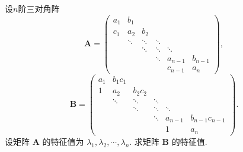 \documentclass[../../main.tex]{subfiles}
\begin{document}
\begin{example}
设$n$阶三对角阵
\[
\boldsymbol{A} = \begin{pmatrix} a_1 & b_1 \\ c_1 & a_2 & b_2 \\ & \ddots & \ddots & \ddots \\ & & \ddots & \ddots & \ddots \\ & & & \ddots & a_{n - 1} & b_{n - 1} \\ & & & & c_{n - 1} & a_n \end{pmatrix},
\]
\[
\boldsymbol{B} = \begin{pmatrix} a_1 & b_1c_1 \\ 1 & a_2 & b_2c_2 \\ & \ddots & \ddots & \ddots \\ & & \ddots & \ddots & \ddots \\ & & & \ddots & a_{n - 1} & b_{n - 1}c_{n - 1} \\ & & & & 1 & a_n \end{pmatrix}.
\]
设矩阵 \(\boldsymbol{A}\) 的特征值为 \(\lambda_1, \lambda_2, \cdots, \lambda_n\). 求矩阵 \(\boldsymbol{B}\) 的特征值.
\end{example}
\end{document}

